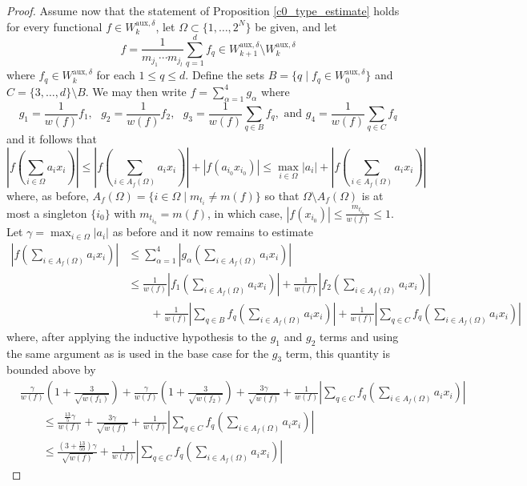 \documentclass[12pt,a4paper]{amsart}
\newcommand{\bes}{\begin{equation*}}
\newcommand{\ees}{\end{equation*}}
\theoremstyle{definition}
\theoremstyle{plain}
\begin{document}
\begin{proof}
Assume now that the statement of Proposition \ref{c0_type_estimate} holds for every functional $f\in W^{\text{aux},\delta}_{k}$, let $\Omega\subset\{1,\ldots,2^{N}\}$ be given, and let 
\bes f=\frac{1}{m_{j_{1}}\cdots m_{j_{l}}}\sum_{q=1}^{d}f_{q}\in W^{\text{aux},\delta}_{k+1}\setminus W^{\text{aux},\delta}_{k} \ees
where $f_{q}\in W^{\text{aux},\delta}_{k}$ for each $1\leq q\leq d$. Define the sets $B=\{q \mid f_{q}\in W^{\text{aux},\delta}_{0}\}$ and $C=\{3,\ldots,d\}\setminus B$. We may then write $f=\sum_{\alpha=1}^{4}g_{\alpha}$ where
\bes g_{1}=\frac{1}{w(f)}f_{1},\text{ }g_{2}=\frac{1}{w(f)}f_{2},\text{ }g_{3}=\frac{1}{w(f)}\sum_{q\in B}f_{q}, \text{ and } g_{4}=\frac{1}{w(f)}\sum_{q\in C}f_{q} \ees
and it follows that
\bes \left\vert f\left(\sum_{i\in\Omega}a_{i}x_{i}\right)\right\vert \leq \left\vert f\left(\sum_{i\in A_{f}(\Omega)}a_{i}x_{i}\right)\right\vert + |f(a_{i_{0}}x_{i_{0}})| \leq \max_{i\in\Omega}|a_{i}|+\left\vert f\left(\sum_{i\in A_{f}(\Omega)}a_{i}x_{i}\right)\right\vert \ees
where, as before, $A_{f}(\Omega)=\{ i\in\Omega \mid m_{t_{i}}\neq m(f)\}$ so that $\Omega\setminus A_{f}(\Omega)$ is at most a singleton $\{i_{0}\}$ with $m_{t_{i_{0}}}=m(f)$, in which case, $|f(x_{i_{0}})|\leq \frac{m_{t_{i_{0}}}}{w(f)}\leq 1$. Let $\gamma=\max_{i\in\Omega}|a_{i}|$ as before and it now remains to estimate
\begin{align*} \left\vert f\left(\sum_{i\in A_{f}(\Omega)}a_{i}x_{i}\right)\right\vert&\leq \sum_{\alpha=1}^{4}\left\vert g_{\alpha}\left(\sum_{i\in A_{f}(\Omega)}a_{i}x_{i}\right)\right\vert \\ &\leq\frac{1}{w(f)}\left\vert f_{1}\left(\sum_{i\in A_{f}(\Omega)}a_{i}x_{i}\right)\right\vert + \frac{1}{w(f)}\left\vert f_{2}\left(\sum_{i\in A_{f}(\Omega)}a_{i}x_{i}\right)\right\vert  \\  &\qquad + \frac{1}{w(f)}\left\vert \sum_{q\in B}f_{q}\left(\sum_{i\in A_{f}(\Omega)}a_{i}x_{i}\right)\right\vert + \frac{1}{w(f)}\left\vert\sum_{q\in C}f_{q}\left(\sum_{i\in A_{f}(\Omega)}a_{i}x_{i}\right)\right\vert  \end{align*} 
where, after applying the inductive hypothesis to the $g_{1}$ and $g_{2}$ terms and using the same argument as is used in the base case for the $g_{3}$ term, this quantity is bounded above by
\begin{align*} &\frac{\gamma}{w(f)}\left(1+\frac{3}{\sqrt{w(f_{1})}}\right)+\frac{\gamma}{w(f)}\left(1+\frac{3}{\sqrt{w(f_{2})}}\right) +\frac{3\gamma}{\sqrt{w(f)}}+\frac{1}{w(f)}\left\vert \sum_{q\in C}f_{q}\left(\sum_{i\in A_{f}(\Omega)}a_{i}x_{i}\right)\right\vert \\  &\qquad\leq \frac{\frac{13}{5}\gamma}{w(f)}+\frac{3\gamma}{\sqrt{w(f)}}+\frac{1}{w(f)}\left\vert\sum_{q\in C}f_{q}\left(\sum_{i\in A_{f}(\Omega)}a_{i}x_{i}\right)\right\vert \\ &\qquad\leq \frac{(3+\frac{13}{50})\gamma}{\sqrt{w(f)}}+ \frac{1}{w(f)}\left\vert\sum_{q\in C}f_{q}\left(\sum_{i\in A_{f}(\Omega)}a_{i}x_{i}\right)\right\vert \end{align*}

\end{proof}
\end{document}
